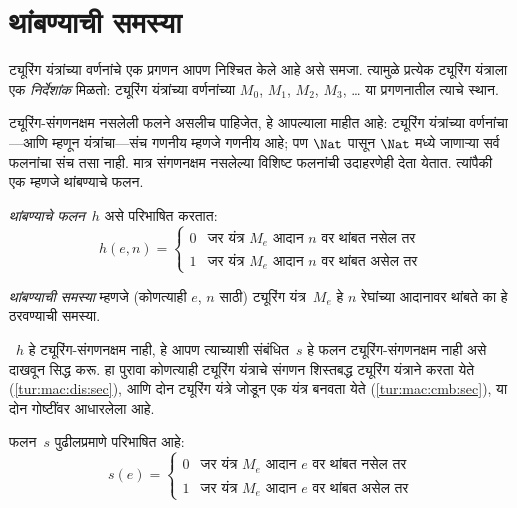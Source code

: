 










\section{थांबण्याची समस्या}\label{tur:und:hal:sec}

\begin{explain}
ट्यूरिंग यंत्रांच्या वर्णनांचे एक प्रगणन आपण निश्चित
केले आहे असे समजा. त्यामुळे प्रत्येक ट्यूरिंग
यंत्राला एक \emph{निर्देशांक} मिळतो: ट्यूरिंग
यंत्रांच्या वर्णनांच्या $M_0$, $M_1$, $M_2$, $M_3$,
\dots{} या प्रगणनातील त्याचे स्थान.


ट्यूरिंग-संगणनक्षम नसलेली फलने असलीच पाहिजेत,
हे आपल्याला माहीत आहे: ट्यूरिंग यंत्रांच्या
वर्णनांचा---आणि म्हणून यंत्रांचा---संच
गणनीय म्हणजे गणनीय आहे; पण
$\Nat$ पासून $\Nat$ मध्ये जाणाऱ्या सर्व
फलनांचा संच तसा नाही. मात्र संगणनक्षम
नसलेल्या विशिष्ट फलनांची उदाहरणेही देता
येतात. त्यांपैकी एक म्हणजे थांबण्याचे फलन.
\end{explain}

\begin{defn}[थांबण्याचे फलन]
 \emph{थांबण्याचे फलन}~$h$ असे परिभाषित करतात:
\[h(e,n) =
\begin{cases}
  \text{0} & \text{जर यंत्र~$M_e$ आदान $n$ वर थांबत नसेल तर} \\
  \text{1} & \text{जर यंत्र~$M_e$ आदान $n$ वर थांबत असेल तर}
\end{cases}
\]
\end{defn}

\begin{defn}[थांबण्याची समस्या]
\emph{थांबण्याची समस्या} म्हणजे (कोणत्याही $e$, $n$
साठी) ट्यूरिंग यंत्र~$M_e$ हे $n$ रेघांच्या
आदानावर थांबते का हे ठरवण्याची समस्या.
\end{defn}

\begin{explain}
~$h$ हे ट्यूरिंग-संगणनक्षम नाही, हे आपण
त्याच्याशी संबंधित~$s$ हे फलन ट्यूरिंग-संगणनक्षम
नाही असे दाखवून सिद्ध करू. हा पुरावा कोणत्याही
ट्यूरिंग यंत्राचे संगणन शिस्तबद्ध ट्यूरिंग
यंत्राने करता येते (\ref{tur:mac:dis:sec}),
आणि दोन ट्यूरिंग यंत्रे जोडून एक यंत्र
बनवता येते (\ref{tur:mac:cmb:sec}),
या दोन गोष्टींवर आधारलेला आहे.
\end{explain}

\begin{defn} फलन~$s$ पुढीलप्रमाणे परिभाषित आहे:
\[s(e) =
\begin{cases}
  \text{0} & \text{जर यंत्र~$M_e$ आदान $e$ वर थांबत नसेल तर} \\
  \text{1} & \text{जर यंत्र~$M_e$ आदान $e$ वर थांबत असेल तर}
\end{cases}
\]
\end{defn}

